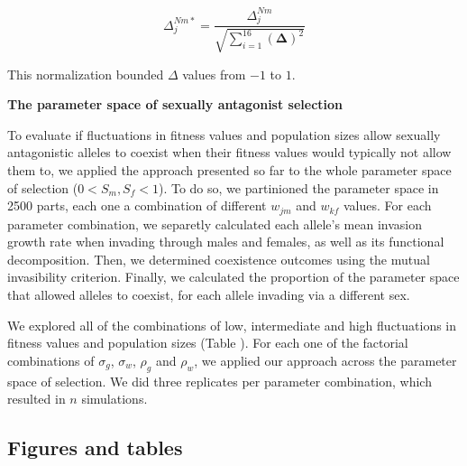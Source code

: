 \documentclass[]{article}
\begin{document}
\begin{equation}
  \Delta^{Nm*}_{j}= \frac{\Delta^{Nm}_{j}}{\sqrt{
    \sum\limits_{i=1}^{16} (\boldsymbol{\Delta})^{2} }}
\end{equation}

This normalization bounded $\Delta$ values from $-1$ to $1$.

\vspace{5mm}
\noindent\textbf{The parameter space of sexually antagonist selection}

To evaluate if fluctuations in fitness values and population sizes allow sexually antagonistic alleles to coexist when their fitness values would typically not allow them to, we applied the approach presented so far to the whole parameter space of selection  ($ 0 < S_{m}, S_{f} < 1$). To do so, we partinioned the parameter space in 2500 parts, each one a combination of different $w_{jm}$ and $w_{kf}$ values. For each parameter combination, we  separetly calculated each allele's mean invasion growth rate when invading through males and females, as well as its functional decomposition. Then, we determined coexistence outcomes using the mutual invasibility criterion. Finally, we calculated the proportion of the parameter space that allowed alleles to coexist, for each allele invading via a different sex.

We explored all of  the combinations of low, intermediate and high fluctuations in fitness values and population sizes (Table ). For each one of the factorial combinations of $\sigma_{g}$, $\sigma_{w}$, $\rho_{g}$ and $\rho_{w}$, we applied our approach across the parameter space of selection. We did three replicates per parameter combination, which resulted in $n$ simulations.



\clearpage
\subsection*{Figures and tables }
\end{document}
